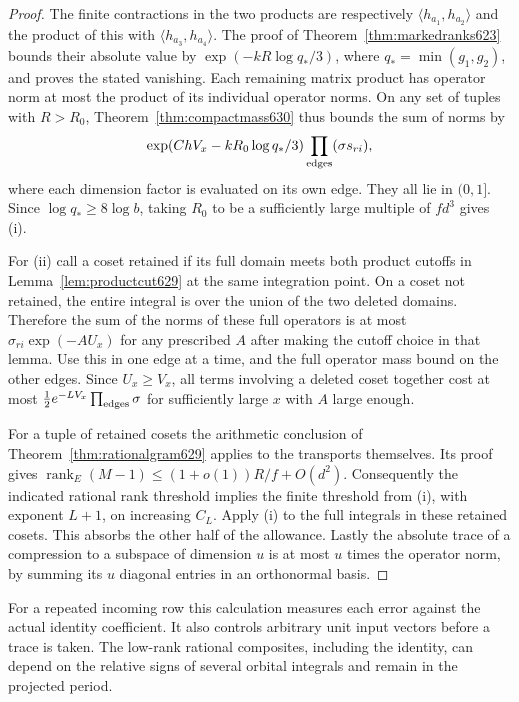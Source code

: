 \documentclass[a4paper,11pt]{article}
\theoremstyle{definition}
\theoremstyle{remark}
\numberwithin{equation}{section}
\begin{document}
\begin{proof}
The finite contractions in the two products are respectively
\(\langle h_{a_1},h_{a_2}\rangle\) and the product of this with
\(\langle h_{a_3},h_{a_4}\rangle\).
The proof of Theorem~\ref{thm:markedranks623} bounds their absolute
value by \(\exp(-kR\log q_*/3)\), where \(q_*=\min(g_1,g_2)\),
and proves the stated vanishing. Each remaining matrix product has
operator norm at most the product of its individual operator norms.
On any set of tuples with \(R>R_0\), Theorem~\ref{thm:compactmass630}
thus bounds the sum of norms by
\[
  \exp(ChV_x-k R_0\log q_*/3)
                    \prod_{\rm edges}(\sigma s_{ri}),
\]
where each dimension factor is evaluated on its own edge. They all
lie in \((0,1]\). Since \(\log q_*\ge 8\log b\), taking \(R_0\)
to be a sufficiently large multiple of \(fd^3\) gives (i).

For (ii) call a coset retained if its full domain meets both
product cutoffs in Lemma~\ref{lem:productcut629} at the same
integration point. On a coset not retained, the entire integral
is over the union of the two deleted domains. Therefore the sum
of the norms of these full operators is at most
\(\sigma_{ri}\exp(-A U_x)\) for any prescribed \(A\) after making
the cutoff choice in that lemma. Use this in one edge at a time,
and the full operator mass bound on the other edges. Since
\(U_x\ge V_x\), all terms involving a deleted coset together
cost at most \(\tfrac12 e^{-LV_x}\prod_{\rm edges}\sigma\)
for sufficiently large \(x\) with \(A\) large enough.

For a tuple of retained cosets the arithmetic conclusion of
Theorem~\ref{thm:rationalgram629} applies to the transports
themselves. Its proof gives
\(\operatorname{rank}_E(M-1)\le (1+o(1))R/f+O(d^2)\).
Consequently the indicated rational rank threshold implies the
finite threshold from (i), with exponent \(L+1\), on increasing
\(C_L\). Apply (i) to the full integrals in these retained
cosets. This absorbs the other half of the allowance.
Lastly the absolute trace of a compression to a subspace of
dimension \(u\) is at most \(u\) times the operator norm, by
summing its \(u\) diagonal entries in an orthonormal basis.
\end{proof}

For a repeated incoming row this calculation measures each error
against the actual identity coefficient. It also controls arbitrary
unit input vectors before a trace is taken. The low-rank rational
composites, including the identity, can depend on the relative signs
of several orbital integrals and remain in the projected period.
\end{document}
